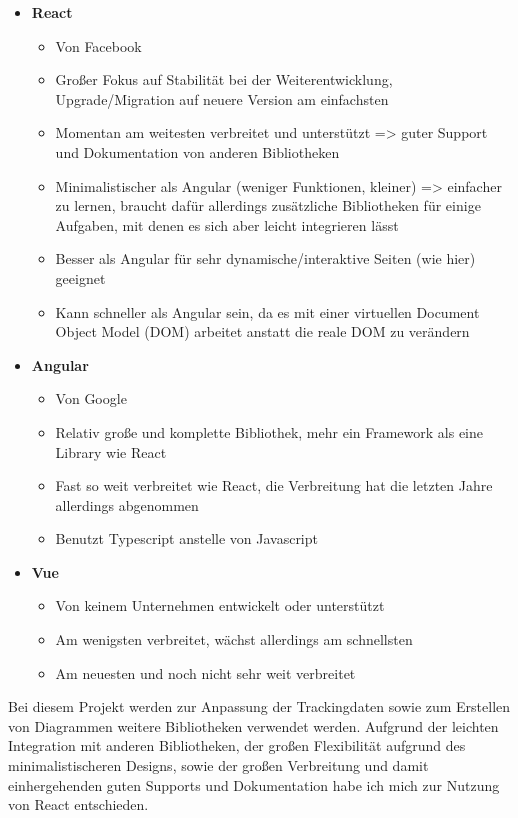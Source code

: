 \begin{itemize}
    \item \textbf{React}
    \begin{itemize}
        \item Von Facebook
        \item Großer Fokus auf Stabilität bei der Weiterentwicklung, Upgrade/Migration auf neuere Version am einfachsten
        \item Momentan am weitesten verbreitet und unterstützt => guter Support und Dokumentation von anderen Bibliotheken
        \item Minimalistischer als Angular (weniger Funktionen, kleiner) => einfacher zu lernen, braucht dafür allerdings zusätzliche Bibliotheken für einige Aufgaben, mit denen es sich aber leicht integrieren lässt
        \item Besser als Angular für sehr dynamische/interaktive Seiten (wie hier) geeignet
        \item Kann schneller als Angular sein, da es mit einer virtuellen Document Object Model (DOM) arbeitet anstatt die reale DOM zu verändern
    \end{itemize}

    \item \textbf{Angular}
    \begin{itemize}
        \item Von Google
        \item Relativ große und komplette Bibliothek, mehr ein Framework als eine Library wie React
        \item Fast so weit verbreitet wie React, die Verbreitung hat die letzten Jahre allerdings abgenommen
        \item Benutzt Typescript anstelle von Javascript
    \end{itemize}
    \item \textbf{Vue}
    \begin{itemize}
        \item Von keinem Unternehmen entwickelt oder unterstützt
        \item Am wenigsten verbreitet, wächst allerdings am schnellsten
        \item Am neuesten und noch nicht sehr weit verbreitet
    \end{itemize}
   
\end{itemize}


Bei diesem Projekt werden zur Anpassung der Trackingdaten sowie zum Erstellen von Diagrammen weitere Bibliotheken verwendet werden. Aufgrund der leichten Integration mit anderen Bibliotheken, der großen Flexibilität aufgrund des minimalistischeren Designs, sowie der großen Verbreitung und damit einhergehenden guten Supports und Dokumentation habe ich mich zur Nutzung von React entschieden.


